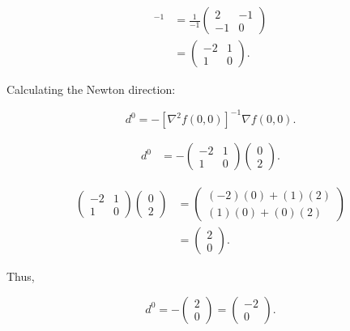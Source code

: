 \documentclass{article}
\begin{document}
\begin{align*}
[\nabla^2 f(0,0)]^{-1} &= \frac{1}{-1}
\begin{pmatrix}
2 & -1 \\
-1 & 0
\end{pmatrix} \\
&=
\begin{pmatrix}
-2 & 1 \\
1 & 0
\end{pmatrix}.
\end{align*}

Calculating the Newton direction:

\begin{equation}
d^0 = - [\nabla^2 f(0,0)]^{-1} \nabla f(0,0).
\end{equation}

\begin{align*}
d^0 &= - 
\begin{pmatrix}
-2 & 1 \\
1 & 0
\end{pmatrix}
\begin{pmatrix}
0 \\
2
\end{pmatrix}.
\end{align*}

\begin{align*}
\begin{pmatrix}
-2 & 1 \\
1 & 0
\end{pmatrix}
\begin{pmatrix}
0 \\
2
\end{pmatrix}
&=
\begin{pmatrix}
(-2)(0) + (1)(2) \\
(1)(0) + (0)(2)
\end{pmatrix} \\
&=
\begin{pmatrix}
2 \\
0
\end{pmatrix}.
\end{align*}

Thus,

\begin{equation}
d^0 = - 
\begin{pmatrix}
2 \\
0
\end{pmatrix}
=
\begin{pmatrix}
-2 \\
0
\end{pmatrix}.
\end{equation}
\end{document}
